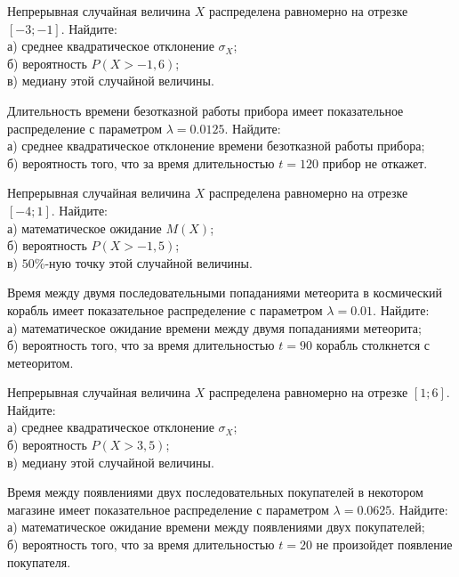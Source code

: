 \vfill

\newpage\setcounter{zad}{0}

\z Непрерывная случайная величина $X$ распределена равномерно на отрезке $[-3; -1]$. Найдите: \\ \quad а) среднее квадратическое отклонение $\sigma_X$; \\ \quad б) вероятность $P(X>-1{,}6)$; \\ \quad в) медиану этой случайной величины.


\vfill

\z Длительность времени безотказной работы прибора имеет показательное распределение с параметром $\lambda = 0.0125$. Найдите: \\ \quad а) среднее квадратическое отклонение времени безотказной работы прибора; \\ \quad б) вероятность того, что за время длительностью $t = 120$ прибор не откажет.
 

\vfill

\newpage\setcounter{zad}{0}

\z Непрерывная случайная величина $X$ распределена равномерно на отрезке $[-4; 1]$. Найдите: \\ \quad а) математическое ожидание $M(X)$; \\ \quad б) вероятность $P(X>-1{,}5)$; \\ \quad в) $50\%$-ную точку этой случайной величины.


\vfill

\z Время между двумя последовательными попаданиями метеорита в космический корабль имеет показательное распределение с параметром $\lambda = 0.01$. Найдите: \\ \quad а) математическое ожидание времени между двумя попаданиями метеорита; \\ \quad б) вероятность того, что за время длительностью $t = 90$ корабль  столкнется с метеоритом.
 

\vfill

\newpage\setcounter{zad}{0}

\z Непрерывная случайная величина $X$ распределена равномерно на отрезке $[1; 6]$. Найдите: \\ \quad а) среднее квадратическое отклонение $\sigma_X$; \\ \quad б) вероятность $P(X>3{,}5)$; \\ \quad в) медиану этой случайной величины.


\vfill

\z Время между появлениями двух последовательных покупателей в некотором магазине имеет показательное распределение с параметром $\lambda = 0.0625$. Найдите: \\ \quad а) математическое ожидание времени между появлениями двух покупателей; \\ \quad б) вероятность того, что за время длительностью $t = 20$ не произойдет появление покупателя.
 

